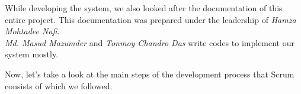 \begin{description}

While developing the system, we also looked after the documentation of this entire project. This documentation was prepared under the leadership of \textit{Hamza Mohtadee Nafi}.\\

\textit{Md. Masud Mazumder} and \textit{Tonmoy Chandro Das} write codes to implement our system mostly.

\end{description}

Now, let’s take a look at the main steps of the development process that Scrum consists of which we followed.

